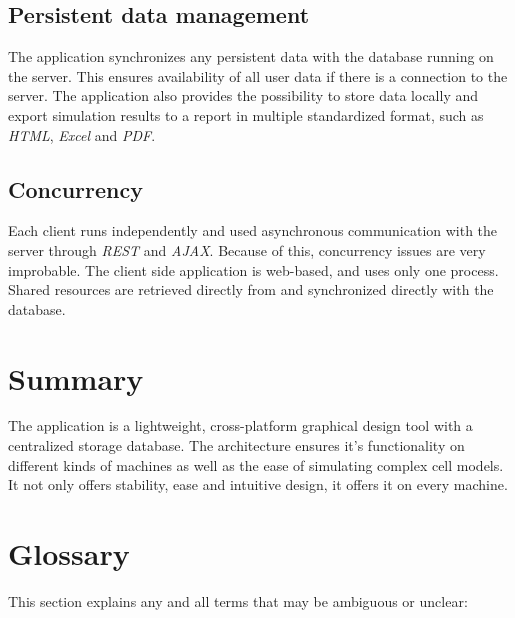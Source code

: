 \documentclass{report}
\begin{document}
		\subsection{Persistent data management}
			The application synchronizes any persistent data with the database running on the server. This ensures availability of all user data if there is a connection to the server. The application also provides the possibility to store data locally and export simulation results to a report in multiple standardized format, such as \emph{HTML}, \emph{Excel} and \emph{PDF}.			\subsection{Concurrency}
			Each client runs independently and used asynchronous communication with the server through \emph{REST} and \emph{AJAX}. Because of this, concurrency issues are very improbable. The client side application is web-based, and uses only one process. Shared resources are retrieved directly from and synchronized directly with the database.
	\clearpage
	\section{Summary}
		The application is a lightweight, cross-platform graphical design tool with a centralized storage database. The architecture ensures it's functionality on different kinds of machines as well as the ease of simulating complex cell models. It not only offers stability, ease and intuitive design, it offers it on every machine.
	\section{Glossary}
		This section explains any and all terms that may be ambiguous or unclear:\\
\end{document}
